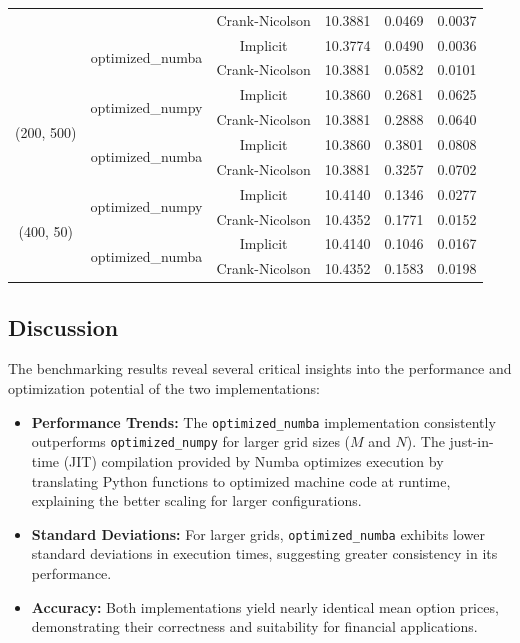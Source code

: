 \documentclass[12pt,a4paper]{report}
\begin{document}
\begin{landscape}
\begin{table}[h!]
\begin{tabular}{|c|c|c|c|c|c|}
         & & Crank-Nicolson & 10.3881 & 0.0469 & 0.0037 \\
         \cline{2-6}
         & \multirow{2}{*}{optimized\_numba} & Implicit & 10.3774 & 0.0490 & 0.0036 \\
         & & Crank-Nicolson & 10.3881 & 0.0582 & 0.0101 \\
        \hline
        \multirow{4}{*}{(200, 500)} & \multirow{2}{*}{optimized\_numpy} & Implicit & 10.3860 & 0.2681 & 0.0625 \\
         & & Crank-Nicolson & 10.3881 & 0.2888 & 0.0640 \\
         \cline{2-6}
         & \multirow{2}{*}{optimized\_numba} & Implicit & 10.3860 & 0.3801 & 0.0808 \\
         & & Crank-Nicolson & 10.3881 & 0.3257 & 0.0702 \\
        \hline
        \multirow{4}{*}{(400, 50)} & \multirow{2}{*}{optimized\_numpy} & Implicit & 10.4140 & 0.1346 & 0.0277 \\
         & & Crank-Nicolson & 10.4352 & 0.1771 & 0.0152 \\
         \cline{2-6}
         & \multirow{2}{*}{optimized\_numba} & Implicit & 10.4140 & 0.1046 & 0.0167 \\
         & & Crank-Nicolson & 10.4352 & 0.1583 & 0.0198 \\
        \hline
    \end{tabular}
\end{table}
\end{landscape}


\subsection{Discussion}

The benchmarking results reveal several critical insights into the performance and optimization potential of the two implementations:

\begin{itemize}
    \item \textbf{Performance Trends:} The \texttt{optimized\_numba} implementation consistently outperforms \texttt{optimized\_numpy} for larger grid sizes (\(M\) and \(N\)). The just-in-time (JIT) compilation provided by Numba optimizes execution by translating Python functions to optimized machine code at runtime, explaining the better scaling for larger configurations.
    \item \textbf{Standard Deviations:} For larger grids, \texttt{optimized\_numba} exhibits lower standard deviations in execution times, suggesting greater consistency in its performance.
    \item \textbf{Accuracy:} Both implementations yield nearly identical mean option prices, demonstrating their correctness and suitability for financial applications.
\end{itemize}
\end{document}
